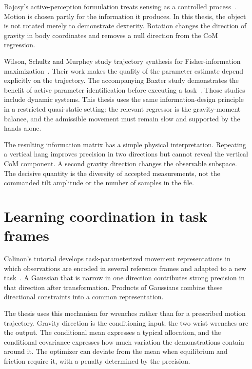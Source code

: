 Bajcsy's active-perception formulation treats sensing as a controlled process~\cite{bajcsy1988}. Motion is chosen partly for the information it produces. In this thesis, the object is not rotated merely to demonstrate dexterity. Rotation changes the direction of gravity in body coordinates and removes a null direction from the CoM regression.

Wilson, Schultz and Murphey study trajectory synthesis for Fisher-information maximization~\cite{wilson2014}. Their work makes the quality of the parameter estimate depend explicitly on the trajectory. The accompanying Baxter study demonstrates the benefit of active parameter identification before executing a task~\cite{wilson2016}. Those studies include dynamic systems. This thesis uses the same information-design principle in a restricted quasi-static setting: the relevant regressor is the gravity-moment balance, and the admissible movement must remain slow and supported by the hands alone.

The resulting information matrix has a simple physical interpretation. Repeating a vertical hang improves precision in two directions but cannot reveal the vertical CoM component. A second gravity direction changes the observable subspace. The decisive quantity is the diversity of accepted measurements, not the commanded tilt amplitude or the number of samples in the file.

\section{Learning coordination in task frames}

Calinon's tutorial develops task-parameterized movement representations in which observations are encoded in several reference frames and adapted to a new task~\cite{calinon2016}. A Gaussian that is narrow in one direction contributes strong precision in that direction after transformation. Products of Gaussians combine these directional constraints into a common representation.

The thesis uses this mechanism for wrenches rather than for a prescribed motion trajectory. Gravity direction is the conditioning input; the two wrist wrenches are the output. The conditional mean expresses a typical allocation, and the conditional covariance expresses how much variation the demonstrations contain around it. The optimizer can deviate from the mean when equilibrium and friction require it, with a penalty determined by the precision.

